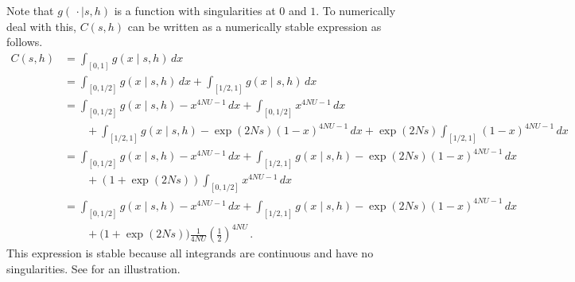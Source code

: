 \documentclass[a4paper,11pt]{article}
\newcommand{\1}{\mathds{1}}
\theoremstyle{plain} %
\theoremstyle{definition} %
\theoremstyle{remark} %
\begin{document}
Note that $g( \, \cdot \mid s, h)$ is a function with singularities at $0$ and $1$.
To numerically deal with this, $C(s, h)$ can be written as a numerically stable expression as follows.
\begin{align*}
	C(s, h) 
		&= \int_{[0, 1]} g(x \mid s, h) \,dx \\
		&= \int_{[0, 1/2]} g(x \mid s, h) \,dx + \int_{[1/2, 1]} g(x \mid s, h) \,dx \\
		&= \int_{[0, 1/2]} g(x \mid s, h) - x^{4 N U - 1} \,dx + \int_{[0, 1/2]} x^{4 N U - 1} \, dx \\
		&\qquad + \int_{[1/2, 1]} g(x \mid s, h) - \exp( 2 N s )(1 - x)^{4 N U - 1} \,dx + \exp( 2 N s ) \int_{[1/2, 1]} (1 - x)^{4 N U - 1} \,dx \\
		&= \int_{[0, 1/2]} g(x \mid s, h) - x^{4 N U - 1} \,dx + \int_{[1/2, 1]} g(x \mid s, h) - \exp( 2 N s )(1 - x)^{4 N U - 1} \,dx \\
		&\qquad + \left( 1 + \exp( 2 N s ) \right) \int_{[0, 1/2]} x^{4 N U - 1} \, dx \\
		&= \int_{[0, 1/2]} g(x \mid s, h) - x^{4 N U - 1} \,dx + \int_{[1/2, 1]} g(x \mid s, h) - \exp( 2 N s )(1 - x)^{4 N U - 1} \,dx \\
		&\qquad + \big( 1 + \exp( 2 N s ) \big) \frac{1}{4 N U} \left(\frac{1}{2}\right)^{4 N U} \,.
\end{align*}
This expression is stable because all integrands are continuous and have no singularities.
See  for an illustration.
\end{document}

